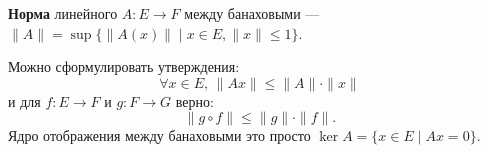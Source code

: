 \begin{to_def}
	\textbf{Норма} линейного $A \colon E \to F$ между банаховыми --- $\|A\| = \sup\{\|A(x)\| \mid x \in E , \|x\| \leq 1\}$.
\end{to_def}
Можно сформулировать утверждения:
\begin{equation*}
	\forall x \in E, \, \|Ax\| \leq \|A\| \cdot \|x\|
\end{equation*}
и для $f \colon E \to F$ и $g \colon F \to G$ верно:
\begin{equation*}
	\|g \circ f\| \leq \|g\| \cdot \|f\|.
\end{equation*}
Ядро отображения между банаховыми это просто $\ker A = \{x \in E \mid A x = 0\} $.